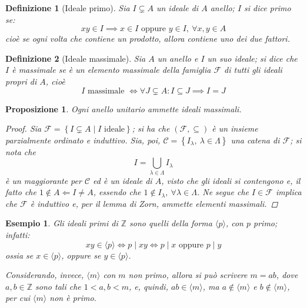 \documentclass[12pt]{scrartcl}
\theoremstyle{style}
\newtheorem{esempio}{Esempio}[section]
\newtheorem{definizione}{Definizione}[section]
\newtheorem{prop}{Proposizione}[section]
\numberwithin{equation}{subsection}
\begin{document}
\begin{definizione}
	[Ideale primo]
	Sia $I \subsetneq A$ un ideale di $A$ anello; $I$ si dice \textit{primo} se:
	\[
	xy \in I \implies x \in I \text{ oppure } y\in I, \ \forall x,y \in A
	\] 
	cio\`e se ogni volta che contiene un prodotto, allora contiene uno dei due fattori.
\end{definizione}
\begin{definizione}
	[Ideale massimale]
	Sia $A$ un anello e $I$ un suo ideale; si dice che $I$ \`e \textit{massimale} se \`e un elemento massimale della famiglia $\mathcal{F} $ di tutti gli ideali propri di $A$, cio\`e
	\[
	I \text{ massimale }\iff\forall J\subsetneq A : I \subseteq J \implies I = J
	\] 
\end{definizione}
\begin{prop}
	Ogni anello unitario ammette ideali massimali.
	\begin{proof}
		Sia $\mathcal{F} = \left\{ I \subsetneq A  \mid I \text{ ideale} \right\}  $; si ha che $(\mathcal{F} ,\subseteq)$ \`e un insieme parzialmente ordinato e induttivo.
		Sia, poi, $\mathcal{C} = \left\{ I_\lambda , \ \lambda \in \Lambda  \right\} $ una catena di $\mathcal{F} $; si nota che
		\[
		I = \bigcup_{\lambda \in \Lambda } I_\lambda 
		\] 
		\`e un maggiorante per $\mathcal{C} $ ed \`e un ideale di $A$, visto che gli ideali si contengono e, il fatto che $1 \not\in A\Leftarrow I\neq A$, essendo che $1\not \in I_\lambda , \ \forall \lambda \in \Lambda $.
		Ne segue che $I \in \mathcal{F} $ implica che $\mathcal{F} $ \`e induttivo e, per il lemma di Zorn, ammette elementi massimali.
	\end{proof}
\end{prop}
\begin{esempio}
Gli ideali primi di $\mathbb{Z}$ sono quelli della forma $\langle p \rangle$, con $p$ primo; infatti:
\[
xy \in \langle p \rangle \iff p  \mid xy \iff p \mid x \text{ oppure }p  \mid y
\] 
ossia se $x \in \langle p \rangle$, oppure se $y \in \langle p \rangle$.

Considerando, invece, $\langle m \rangle$ con $m$ non primo, allora si pu\`o scrivere $m = ab$, dove $a,b \in \mathbb{Z}$ sono tali che $1<a,b<m$, e, quindi, $ab \in \langle m \rangle$, ma $a \not \in \langle m \rangle$ e $b \not \in \langle m \rangle$, per cui $\langle m \rangle$ non \`e primo.
\end{esempio}
\end{document}
